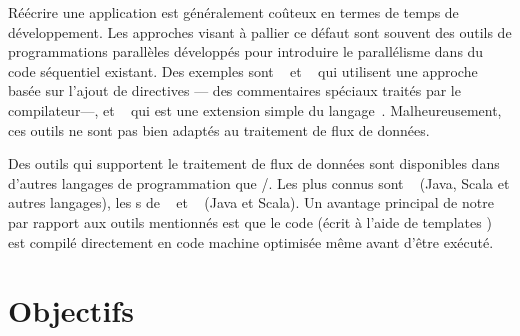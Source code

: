 \begin{introduction}

R\'e\'ecrire une application est g\'en\'eralement co\^uteux en termes de temps de d\'eveloppement. Les approches visant \`a pallier ce d\'efaut sont souvent des outils de programmations parall\`eles d\'evelopp\'es pour introduire le parall\'elisme dans du code s\'equentiel existant. Des exemples sont ~\citep{ChandraEtAl01} et ~\citep{farber2016parallel} qui utilisent une approche bas\'ee sur l'ajout de directives --- des commentaires sp\'eciaux trait\'es par le compilateur---, et ~\citep{leiserson1998programming} qui est une extension simple du langage~. Malheureusement, ces outils ne sont pas bien adapt\'es au traitement de flux de donn\'ees.


Des outils qui supportent le traitement de flux de donn\'ees sont disponibles dans d'autres langages de programmation que /. Les plus connus sont ~\citep{frampton2015mastering} (Java, Scala et autres langages), les s de ~\citep{warburton2014java} et ~\citep{flinkReferenceEnLigne} (Java et Scala). Un avantage principal de notre  par rapport aux outils mentionn\'es est que le code (\'ecrit \`a l'aide de templates ) est compil\'e directement en code machine optimis\'ee m\^eme avant d'\^etre ex\'ecut\'e. 


\section*{Objectifs}



\end{introduction}

